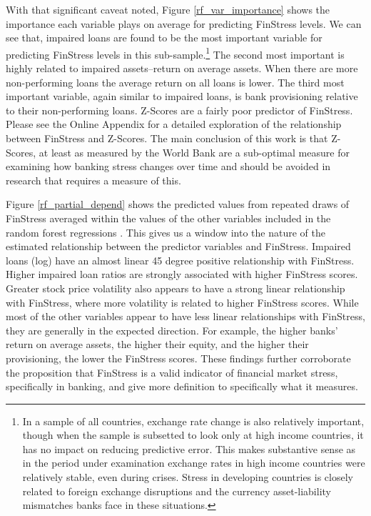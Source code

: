 \documentclass[]{article}
\begin{document}
With that significant caveat noted, Figure \ref{rf_var_importance} shows the importance each variable plays on average for predicting FinStress levels. We can see that, impaired loans are found to be the most important variable for predicting FinStress levels in this sub-sample.\footnote{In a sample of all countries, exchange rate change is also relatively important, though when the sample is subsetted to look only at high income countries, it has no impact on reducing predictive error. This makes substantive sense as in the period under examination exchange rates in high income countries were relatively stable, even during crises. Stress in developing countries is closely related to foreign exchange disruptions and the currency asset-liability mismatches banks face in these situations.} The second most important is highly related to impaired assets--return on average assets. When there are more non-performing loans the average return on all loans is lower. The third most important variable, again similar to impaired loans, is bank provisioning relative to their non-performing loans. Z-Scores are a fairly poor predictor of FinStress. Please see the Online Appendix for a detailed exploration of the relationship between FinStress and Z-Scores. The main conclusion of this work is that Z-Scores, at least as measured by the World Bank are a sub-optimal measure for examining how banking stress changes over time and should be avoided in research that requires a measure of this.

Figure \ref{rf_partial_depend} shows the predicted values from repeated draws of FinStress averaged within the values of the other variables included in the random forest regressions \citep[see][14]{jones2015}. This gives us a window into the nature of the estimated relationship between the predictor variables and FinStress. Impaired loans (log) have an almost linear 45 degree positive relationship with FinStress. Higher impaired loan ratios are strongly associated with higher FinStress scores. Greater stock price volatility also appears to have a strong linear relationship with FinStress, where more volatility is related to higher FinStress scores. While most of the other variables appear to have less linear relationships with FinStress, they are generally in the expected direction. For example, the higher banks' return on average assets, the higher their equity, and the higher their provisioning, the lower the FinStress scores. These findings further corroborate the proposition that FinStress is a valid indicator of financial market stress, specifically in banking, and give more definition to specifically what it measures.
\end{document}
